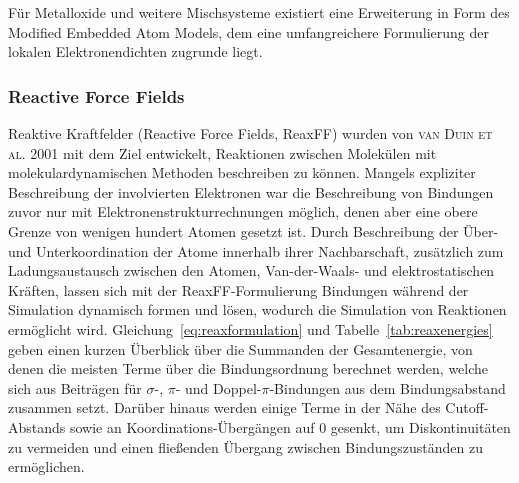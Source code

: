 
Für Metalloxide und weitere Mischsysteme existiert eine Erweiterung in Form des Modified Embedded Atom Models\cite{baskes_modified_1992}, dem eine umfangreichere Formulierung der lokalen Elektronendichten zugrunde liegt.



\subsubsection{Reactive Force Fields}

Reaktive Kraftfelder (Reactive Force Fields, ReaxFF) wurden von \textsc{van Duin et al.}\cite{van_duin_reaxff:_2001} 2001 mit dem Ziel entwickelt, Reaktionen zwischen Molekülen mit molekulardynamischen Methoden beschreiben zu können.
Mangels expliziter Beschreibung der involvierten Elektronen war die Beschreibung von Bindungen zuvor nur mit Elektronenstrukturrechnungen möglich, denen aber eine obere Grenze von wenigen hundert Atomen gesetzt ist.
Durch Beschreibung der Über- und Unterkoordination der Atome innerhalb ihrer Nachbarschaft, zusätzlich zum Ladungsaustausch zwischen den Atomen, Van-der-Waals- und elektrostatischen Kräften, lassen sich mit der ReaxFF-Formulierung Bindungen während der Simulation dynamisch formen und lösen, wodurch die Simulation von Reaktionen ermöglicht wird.
Gleichung~\ref{eq:reaxformulation} und Tabelle~\ref{tab:reaxenergies} geben einen kurzen Überblick über die Summanden der Gesamtenergie, von denen die meisten Terme über die Bindungsordnung berechnet werden, welche sich aus Beiträgen für $\sigma$-, $\pi$- und Doppel-$\pi$-Bindungen aus dem Bindungsabstand zusammen setzt.
Darüber hinaus werden einige Terme in der Nähe des Cutoff-Abstands sowie an Koordinations-Übergängen auf 0 gesenkt, um Diskontinuitäten zu vermeiden und einen fließenden Übergang zwischen Bindungszuständen zu ermöglichen.

